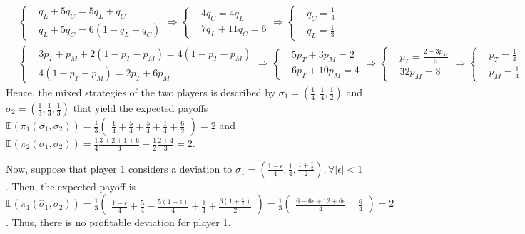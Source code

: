 \documentclass[]{article}
\begin{document}
\begin{equation}
	\begin{split}
		&\begin{cases}
			&q_L + 5q_C = 5q_L + q_C \\
			&q_L + 5q_C = 6(1 - q_L - q_C)
		\end{cases} \Rightarrow \begin{cases}
		&4q_C = 4q_L \\
		&7q_L + 11q_C = 6
		\end{cases} \Rightarrow \begin{cases}
		&q_C = \frac{1}{3} \\
		&q_L = \frac{1}{3}		
		\end{cases} \\ \nonumber
		&\begin{cases}
		&3p_T + p_M + 2(1 - p_T - p_M) = 4(1 - p_T - p_M) \\
		&4(1 - p_T - p_M) = 2p_T + 6p_M
		\end{cases} \Rightarrow \begin{cases}
		&5p_T + 3p_M = 2 \\
		&6p_T + 10p_M = 4
		\end{cases} \Rightarrow \begin{cases}
		&p_T = \frac{2 - 3p_M}{5} \\
		&32p_M = 8
		\end{cases} \Rightarrow \begin{cases}
		&p_T = \frac{1}{4} \\
		&p_M = \frac{1}{4}
		\end{cases}
	\end{split}
\end{equation}
Hence, the mixed strategies of the two players is described by $\sigma_1 = (\frac{1}{4}, \frac{1}{4}, \frac{1}{2})$ and $\sigma_2 = (\frac{1}{3}, \frac{1}{3}, \frac{1}{3})$ that yield the expected payoffs $\mathbb{E}(\pi_1(\sigma_1, \sigma_2)) = \frac{1}{3}\begin{pmatrix}\frac{1}{4} + \frac{5}{4} + \frac{5}{4} + \frac{1}{4} + \frac{6}{2}\end{pmatrix} = 2$ and $\mathbb{E}(\pi_2(\sigma_1, \sigma_2)) = \frac{1}{4}\frac{3+2+1+6}{3} + \frac{1}{2}\frac{2 + 4}{3} = 2$.

Now, suppose that player 1 considers a deviation to $\hat{\sigma}_1 = (\frac{1-\epsilon}{4}, \frac{1}{4}, \frac{1+\frac{\epsilon}{2}}{2}), \forall\mid\epsilon\mid<1$. Then, the expected payoff is $\mathbb{E}(\pi_1(\hat{\sigma}_1, \sigma_2)) = \frac{1}{3}\begin{pmatrix}\frac{1 - \epsilon}{4} + \frac{5}{4} + \frac{5(1 - \epsilon)}{4} + \frac{1}{4} + \frac{6(1 + \frac{\epsilon}{2})}{2}\end{pmatrix} = \frac{1}{3}\begin{pmatrix}\frac{6 - 6\epsilon + 12 + 6\epsilon}{4} + \frac{6}{4}\end{pmatrix} = 2$. Thus, there is no profitable deviation for player 1. 
\end{document}
